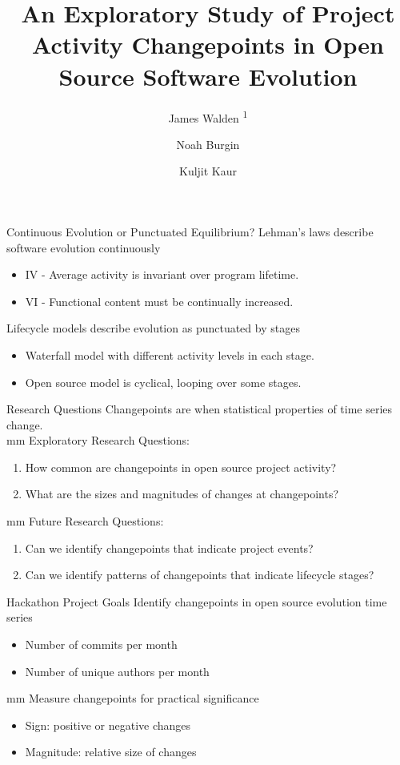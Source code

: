 \documentclass[11pt,handout]{beamer}
\title[Changepoints in Open Source Evolution]{An Exploratory Study of Project Activity Changepoints in Open Source Software Evolution}
\author[]{James Walden \textsuperscript{1} \and Noah Burgin \inst{2} \and Kuljit Kaur\inst{3}}
\institute[]{\textsuperscript{1} Northern Kentucky University \and \inst{2} %
   University of Tennessee, Knoxville \and \inst{3} Guru Nanak Dev University}
\date{}
\begin{document}
\begin{frame}
    \titlepage
\end{frame}

\begin{frame}{Continuous Evolution or Punctuated Equilibrium?}
    Lehman's laws describe software evolution continuously
    \begin{itemize}
        \item IV - Average activity is invariant over program lifetime.
        \item VI - Functional content must be continually increased.
    \end{itemize}
    \vskip 5mm
    Lifecycle models describe evolution as punctuated by stages
    \begin{itemize}
        \item Waterfall model with different activity levels in each stage.
        \item Open source model is cyclical, looping over some stages.
    \end{itemize}
\end{frame}

\begin{frame}{Research Questions}
    Changepoints are when statistical properties of time series change.\\
     mm
    Exploratory Research Questions:
    \begin{enumerate}
        \item How common are changepoints in open source project activity?
        \item What are the sizes and magnitudes of changes at changepoints?
    \end{enumerate}
     mm
    Future Research Questions:
    \begin{enumerate}
        \item Can we identify changepoints that indicate project events?
        \item Can we identify patterns of changepoints that indicate lifecycle stages?
    \end{enumerate}
\end{frame}

\begin{frame}{Hackathon Project Goals}
    Identify changepoints in open source evolution time series
    \begin{itemize}
        \item Number of commits per month
        \item Number of unique authors per month
    \end{itemize}
     mm
    Measure changepoints for practical significance
    \begin{itemize}
        \item Sign: positive or negative changes
        \item Magnitude: relative size of changes
    \end{itemize}
\end{frame}
\end{document}
